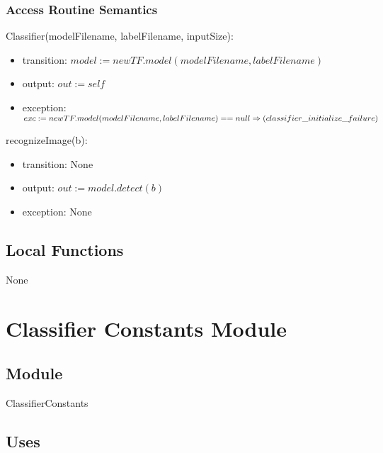 \documentclass[12pt, titlepage]{article}
\begin{document}
\subsubsection* {Access Routine Semantics}

\noindent  Classifier(modelFilename, labelFilename, inputSize):
\begin{itemize}
\item transition: $model := new TF.model(modelFilename, labelFilename)$
\item output: $out := self$\\
\item exception: $exc := new TF.model(modelFilename, labelFilename) == null \break \Rightarrow (classifier\_initialize\_failure)\\$

\end{itemize}

\noindent recognizeImage(b):
\begin{itemize}
\item transition: None\\
\item output: $out := model.detect(b)$\\
\item exception: None\\

\end{itemize}

\subsection*{Local Functions}

None

\medskip
\medskip


\newpage

\section* {Classifier Constants Module}

\subsection*{Module}

ClassifierConstants

\subsection* {Uses}
\end{document}
